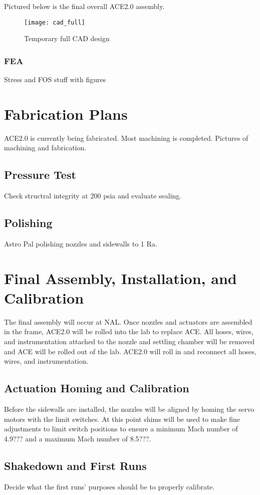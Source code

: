 Pictured below is the final overall ACE2.0 assembly.

\begin{figure}[ht]
    \centering
    \texttt{[image: cad\_full]}
    \caption{Temporary full CAD design}
    \label{fig:cad_full}
\end{figure}

\subsubsection{FEA}

Stress and FOS stuff with figures

\section{Fabrication Plans}

ACE2.0 is currently being fabricated. Most machining is completed. Pictures of machining and fabrication.

\subsection{Pressure Test}

Check structral integrity at 200 psia and evaluate sealing.

\subsection{Polishing}

Astro Pal polishing nozzles and sidewalls to 1 Ra.

\section{Final Assembly, Installation, and Calibration}

The final assembly will occur at NAL. Once nozzles and actuators are assembled in the frame, ACE2.0 will be rolled into the lab to replace ACE. All hoses, wires, and instrumentation attached to the nozzle and settling chamber will be removed and ACE will be rolled out of the lab. ACE2.0 will roll in and reconnect all hoses, wires, and instrumentation.

\subsection{Actuation Homing and Calibration}

Before the sidewalls are installed, the nozzles will be aligned by homing the servo motors with the limit switches. At this point shims will be used to make fine adjustments to limit switch positions to ensure a minimum Mach number of 4.9??? and a maximum Mach number of 8.5???.

\subsection{Shakedown and First Runs}

Decide what the first runs' purposes should be to properly calibrate.

